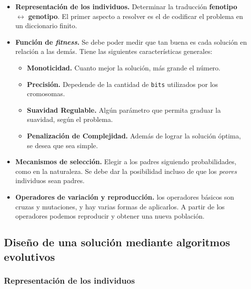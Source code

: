 \documentclass[10pt,a4paper]{article}
\begin{document}
\begin{itemize}
\item \textbf{Representación de los individuos.} Determinar la traducción \textbf{fenotipo} $\leftrightarrow$ \textbf{genotipo}. El primer aspecto a resolver es el de codificar el problema en un diccionario finito.
\item \textbf{Función de \textit{fitness}.} Se debe poder medir que tan buena es cada solución en relación a las demás. Tiene las siguientes características generales:
\begin{itemize}
\item \textbf{Monoticidad.} Cuanto mejor la solución, más grande el número.
\item \textbf{Precisión.} Depedende de la cantidad de \texttt{bits} utilizados por los cromosomas.
\item \textbf{Suavidad Regulable.} Algún parámetro que permita graduar la suavidad, según el problema.
\item \textbf{Penalización de Complejidad.} Además de lograr la solución óptima, se desea que sea simple.
\end{itemize}
\item \textbf{Mecanismos de selección.} Elegir a los padres siguiendo probabilidades, como en la naturaleza. Se debe dar la posibilidad incluso de que los \textit{peores} individuos sean padres.
\item \textbf{Operadores de variación y reproducción.} los operadores básicos son cruzas y mutaciones, y hay varias formas de aplicarlos. A partir de los operadores podemos reproducir y obtener una nueva población.
\end{itemize}

\subsection{Diseño de una solución mediante algoritmos evolutivos}

\subsubsection{Representación de los individuos}
\end{document}
